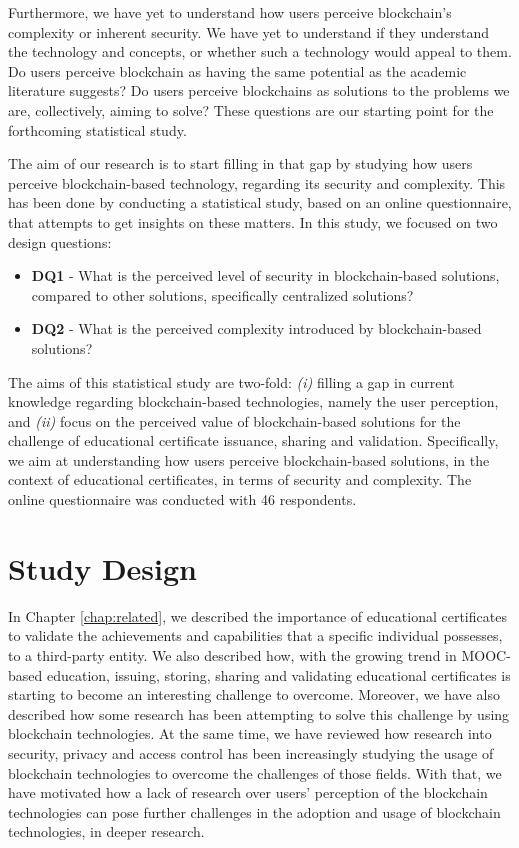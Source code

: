 Furthermore, we have yet to understand how users perceive blockchain's complexity or inherent security. We have yet to understand if they understand the technology and concepts, or whether such a technology would appeal to them. Do users perceive blockchain as having the same potential as the academic literature suggests? Do users perceive blockchains as solutions to the problems we are, collectively, aiming to solve? These questions are our starting point for the forthcoming statistical study.

The aim of our research is to start filling in that gap by studying how users perceive blockchain-based technology, regarding its security and complexity. This has been done by conducting a statistical study, based on an online questionnaire, that attempts to get insights on these matters. In this study, we focused on two design questions:

\begin{itemize}
	\item \textbf{DQ1} - What is the perceived level of security in blockchain-based solutions, compared to other solutions, specifically centralized solutions?
	\item \textbf{DQ2} - What is the perceived complexity introduced by blockchain-based solutions?
\end{itemize}

The aims of this statistical study are two-fold: \emph{(i)} filling a gap in current knowledge regarding blockchain-based technologies, namely the user perception, and \emph{(ii)} focus on the perceived value of blockchain-based solutions for the challenge of educational certificate issuance, sharing and validation. Specifically, we aim at understanding how users perceive blockchain-based solutions, in the context of educational certificates, in terms of security and complexity. The online questionnaire was conducted with 46 respondents.

\section{Study Design}

In Chapter \ref{chap:related}, we described the importance of educational certificates to validate the achievements and capabilities that a specific individual possesses, to a third-party entity. We also described how, with the growing trend in MOOC-based education, issuing, storing, sharing and validating educational certificates is starting to become an interesting challenge to overcome. Moreover, we have also described how some research has been attempting to solve this challenge by using blockchain technologies. At the same time, we have reviewed how research into security, privacy and access control has been increasingly studying the usage of blockchain technologies to overcome the challenges of those fields. With that, we have motivated how a lack of research over users' perception of the blockchain technologies can pose further challenges in the adoption and usage of blockchain technologies, in deeper research.


